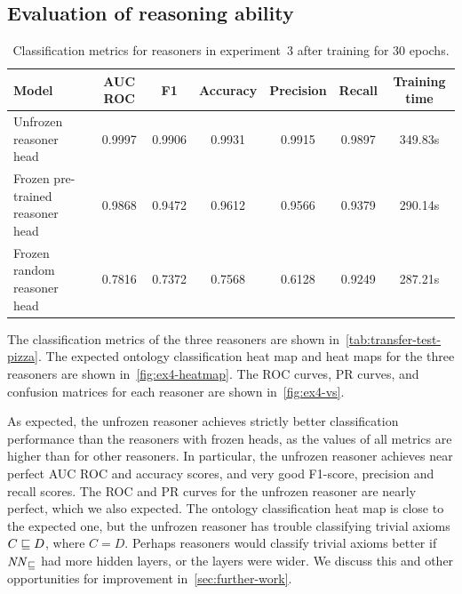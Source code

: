 \subsection{Evaluation of reasoning ability}

\begin{table}
\caption{Classification metrics for reasoners in experiment~3 after training for 30 epochs.}
\label{tab:transfer-test-pizza}
\begin{adjustwidth}{-2cm}{-2cm}
\centering
\begin{tabular}{lcccccc}
\toprule
Model                            & AUC ROC & F1     & Accuracy & Precision & Recall & Training time \\
\midrule
Unfrozen reasoner head           & 0.9997 & 0.9906 & 0.9931 & 0.9915 & 0.9897 & 349.83s \\
Frozen pre-trained reasoner head & 0.9868 & 0.9472 & 0.9612 & 0.9566 & 0.9379 & 290.14s \\
Frozen random reasoner head      & 0.7816 & 0.7372 & 0.7568 & 0.6128 & 0.9249 & 287.21s \\
\bottomrule
\end{tabular}
\end{adjustwidth}
\end{table}

The classification metrics of the three reasoners are shown in~\autoref{tab:transfer-test-pizza}.
The expected ontology classification heat map and heat maps for the three reasoners are shown in~\autoref{fig:ex4-heatmap}.
The ROC curves, PR curves, and confusion matrices for each reasoner are shown in~\autoref{fig:ex4-vs}.

As expected, the unfrozen reasoner achieves strictly better classification performance than the reasoners with frozen heads, as the values of all metrics are higher than for other reasoners.
In particular, the unfrozen reasoner achieves near perfect AUC ROC and accuracy scores, and very good F1-score, precision and recall scores.
The ROC and PR curves for the unfrozen reasoner are nearly perfect, which we also expected.
The ontology classification heat map is close to the expected one, but the unfrozen reasoner has trouble classifying trivial axioms $C \sqsubseteq D$, where $C = D$.
Perhaps reasoners would classify trivial axioms better if $\mathit{NN}_\sqsubseteq$ had more hidden layers, or the layers were wider.
We discuss this and other opportunities for improvement in~\autoref{sec:further-work}.

